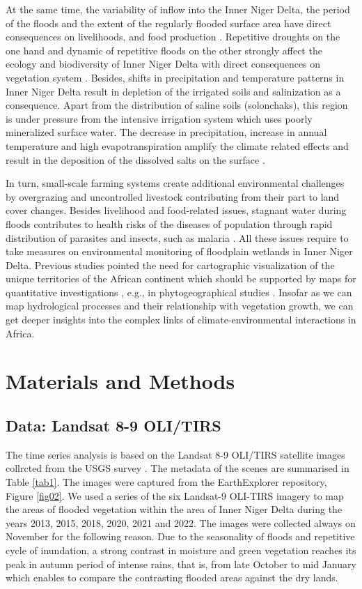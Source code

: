 \documentclass[remotesensing,article,submit,pdftex,moreauthors]{Definitions/mdpi}
\begin{document}
At the same time, the variability of inflow into the Inner Niger Delta, the period of the floods and the extent of the regularly flooded surface area have direct consequences on livelihoods, and food production \cite{LIERSCH201318}. Repetitive droughts on the one hand and dynamic of repetitive floods on the other strongly affect the ecology and biodiversity of Inner Niger Delta with direct consequences on vegetation system \cite{mariko2003caracterisation}. Besides, shifts in precipitation and temperature patterns in Inner Niger Delta result in depletion of the irrigated soils and salinization as a consequence. Apart from the distribution of saline soils (solonchaks), this region is under pressure from the intensive irrigation system which uses poorly mineralized surface water. The decrease in precipitation, increase in annual temperature and high evapotranspiration amplify the climate related effects and result in the deposition of the dissolved salts on the surface \cite{Valenza}. 

In turn, small-scale farming systems create additional environmental challenges by overgrazing and uncontrolled livestock contributing from their part to land cover changes. Besides livelihood and food-related issues, stagnant water during floods contributes to health risks of the diseases of population through rapid distribution of parasites and insects, such as malaria \cite{COOLS201334,Klinkenberg}. All these issues require to take measures on environmental monitoring of floodplain wetlands in Inner Niger Delta. Previous studies pointed the need for cartographic visualization of the unique territories of the African continent which should be supported by maps for quantitative investigations \cite{Cabot1968}, e.g., in phytogeographical studies \cite{Robequain}. Insofar as we can map hydrological processes and their relationship with vegetation growth, we can get deeper insights into the complex links of climate-environmental interactions in Africa.

\section{Materials and Methods}

\subsection{Data: Landsat 8-9 OLI/TIRS}
The time series analysis is based on the Landsat 8-9 OLI/TIRS satellite images collrcted from the USGS survey \cite{Landsat9}. The metadata of the scenes are summarised in Table \ref{tab1}. The images were captured from the EarthExplorer repository, Figure \ref{fig02}. We used a series of the six Landsat-9 OLI-TIRS imagery to map the areas of flooded vegetation within the area of Inner Niger Delta during the years 2013, 2015, 2018, 2020, 2021 and 2022. The images were collected always on November for the following reason. Due to the seasonality of floods and repetitive cycle of inundation, a strong contrast in moisture and green vegetation reaches its peak in autumn period of intense rains, that is, from late October to mid January which enables to compare the contrasting flooded areas against the dry lands. 
\end{document}
